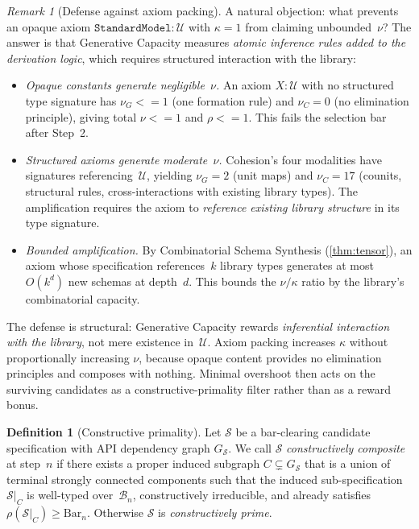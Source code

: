 \documentclass[11pt,a4paper]{article}
\def\leq{<=}%
\theoremstyle{plain}
\theoremstyle{definition}
\newtheorem{definition}[theorem]{Definition}
\theoremstyle{remark}
\newtheorem{remark}[theorem]{Remark}
\begin{document}
\begin{remark}[Defense against axiom packing]
\label{rem:axiom-packing}
A natural objection: what prevents an opaque axiom $\mathtt{StandardModel} : \mathcal{U}$ with $\kappa = 1$ from claiming unbounded~$\nu$?  The answer is that Generative Capacity measures \emph{atomic inference rules added to the derivation logic}, which requires structured interaction with the library:

\begin{itemize}[nosep]
    \item \emph{Opaque constants generate negligible~$\nu$.}  An axiom $X : \mathcal{U}$ with no structured type signature has $\nu_G \leq 1$ (one formation rule) and $\nu_C = 0$ (no elimination principle), giving total $\nu \leq 1$ and $\rho \leq 1$.  This fails the selection bar after Step~2.
    \item \emph{Structured axioms generate moderate~$\nu$.}  Cohesion's four modalities have signatures referencing~$\mathcal{U}$, yielding $\nu_G = 2$ (unit maps) and $\nu_C = 17$ (counits, structural rules, cross-interactions with existing library types).  The amplification requires the axiom to \emph{reference existing library structure} in its type signature.
    \item \emph{Bounded amplification.}  By Combinatorial Schema Synthesis (\cref{thm:tensor}), an axiom whose specification references~$k$ library types generates at most $O(k^d)$ new schemas at depth~$d$.  This bounds the $\nu/\kappa$ ratio by the library's combinatorial capacity.
\end{itemize}

\noindent The defense is structural: Generative Capacity rewards \emph{inferential interaction with the library}, not mere existence in~$\mathcal{U}$.  Axiom packing increases $\kappa$ without proportionally increasing $\nu$, because opaque content provides no elimination principles and composes with nothing.  Minimal overshoot then acts on the surviving candidates as a constructive-primality filter rather than as a reward bonus.
\end{remark}

\begin{definition}[Constructive primality]
\label{def:primality}
Let $\mathcal{S}$ be a bar-clearing candidate specification with API dependency graph $G_{\mathcal{S}}$.
We call $\mathcal{S}$ \emph{constructively composite} at step~$n$ if there exists a proper induced subgraph $C \subsetneq G_{\mathcal{S}}$ that is a union of terminal strongly connected components such that the induced sub-specification $\mathcal{S}|_C$ is well-typed over~$\mathcal{B}_n$, constructively irreducible, and already satisfies $\rho(\mathcal{S}|_C) \ge \mathrm{Bar}_n$.
Otherwise $\mathcal{S}$ is \emph{constructively prime}.
\end{definition}
\end{document}
